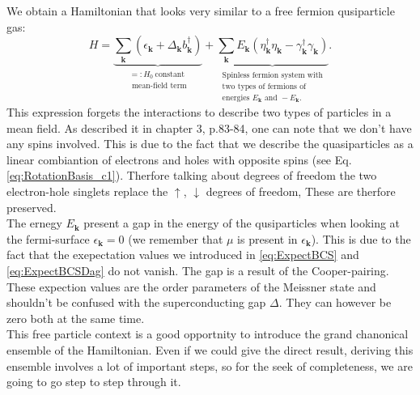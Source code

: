 \documentclass[../main.tex]{subfile}
\begin{document}
We obtain a Hamiltonian that looks very similar to a free fermion qusiparticle gas:
\begin{equation}\label{eq:HamiltonianBCS2}
H = \underbrace{\sum_{\bm{k}} \left(\epsilon_{\bm{k}} + \Delta_{\bm{k}} b_{\bm{k}}^{\dagger}\right)}_{\substack{=:H_0~ \text{constant}\\\text{ mean-field term}}}  + \underbrace{\sum_{\bm{k}} E_{\bm{k}}\left(\eta_{\bm{k}}^{\dagger}\eta_{\bm{k}} - \gamma_{\bm{k}}^{\dagger}\gamma_{\bm{k}}\right)}_{\substack{\text{Spinless fermion system with} \\\text{two types of fermions of}\\\text{energies }E_{\bm{k}}\text{ and }-E_{\bm{k}}.}}.
\end{equation}
This expression forgets the interactions to describe two types of particles in a mean field. 
As \cite{FossheimSudbo2004} described it in chapter 3, p.83-84, one can note that we don't have any spins involved. This is due
to the fact that we describe the quasiparticles as a linear combiantion of electrons and holes with opposite spins (see Eq.\ref{eq:RotationBasis_c1}).
Therfore talking about degrees of freedom the two electron-hole singlets replace the $\uparrow$, $\downarrow$ degrees of freedom, These are therfore preserved.\\

The ernegy $E_{\bm{k}}$ present a gap in the energy of the qusiparticles when looking at the fermi-surface $\epsilon_{\bm{k}}=0$ (we remember that $\mu$ is present in $\epsilon_{\bm{k}}$).
This is due to the fact that the exepectation values we introduced in \ref{eq:ExpectBCS} and \ref{eq:ExpectBCSDag} do not vanish. The gap is a result of the Cooper-pairing. These expection values
are the order parameters of the Meissner state and shouldn't be confused with the superconducting gap $\Delta$. They can however be zero both at the same time. \\

This free particle context is a good opportnity to introduce the grand chanonical ensemble of the Hamiltonian. 
Even if we could give the direct result, deriving this ensemble involves a lot of important steps, so for
the seek of completeness, we are going to go step to step through it.\\
\end{document}
